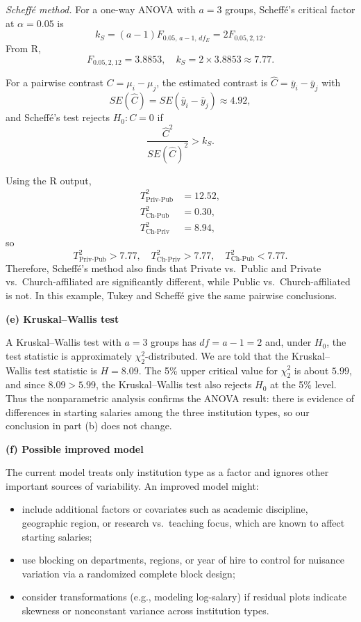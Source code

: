 \documentclass[answers,12pt,addpoints]{exam}
\begin{document}
\emph{Scheff\'e method.}
For a one-way ANOVA with $a=3$ groups, Scheff\'e's critical factor at
$\alpha = 0.05$ is
\[
k_S = (a-1)F_{0.05,\,a-1,\,df_E}
= 2 F_{0.05,2,12}.
\]
From R,
\[
F_{0.05,2,12} = 3.8853,\quad
k_S = 2 \times 3.8853 \approx 7.77.
\]

For a pairwise contrast $C = \mu_i - \mu_j$, the estimated contrast is
$\hat{C} = \bar{y}_i - \bar{y}_j$ with
\[
SE(\hat{C}) = SE(\bar{y}_i - \bar{y}_j) \approx 4.92,
\]
and Scheff\'e's test rejects $H_0: C=0$ if
\[
\frac{\hat{C}^2}{SE(\hat{C})^2} > k_S.
\]

Using the R output,
\[
\begin{aligned}
T^2_{\text{Priv-Pub}} &= 12.52,\\
T^2_{\text{Ch-Pub}}   &= 0.30,\\
T^2_{\text{Ch-Priv}}  &= 8.94,
\end{aligned}
\]
so
\[
T^2_{\text{Priv-Pub}} > 7.77,\quad
T^2_{\text{Ch-Priv}} > 7.77,\quad
T^2_{\text{Ch-Pub}} < 7.77.
\]
Therefore, Scheff\'e's method also finds that Private vs.\ Public and
Private vs.\ Church-affiliated are significantly different, while Public vs.\
Church-affiliated is not. In this example, Tukey and Scheff\'e give the same
pairwise conclusions.

\medskip
\textbf{(e) Kruskal--Wallis test}

A Kruskal--Wallis test with $a=3$ groups has $df = a-1 = 2$ and, under $H_0$,
the test statistic is approximately $\chi^2_2$-distributed. We are told that
the Kruskal--Wallis test statistic is $H = 8.09$. The 5\% upper critical value
for $\chi^2_2$ is about $5.99$, and since $8.09 > 5.99$, the Kruskal--Wallis
test also rejects $H_0$ at the 5\% level. Thus the nonparametric analysis
confirms the ANOVA result: there is evidence of differences in starting salaries
among the three institution types, so our conclusion in part (b) does not
change.

\medskip
\textbf{(f) Possible improved model}

The current model treats only institution type as a factor and ignores other
important sources of variability. An improved model might:

\begin{itemize}
  \item include additional factors or covariates such as academic discipline,
  geographic region, or research vs.\ teaching focus, which are known to affect
  starting salaries;
  \item use blocking on departments, regions, or year of hire to control for
  nuisance variation via a randomized complete block design;
  \item consider transformations (e.g., modeling log-salary) if residual plots
  indicate skewness or nonconstant variance across institution types.
\end{itemize}
\end{document}
